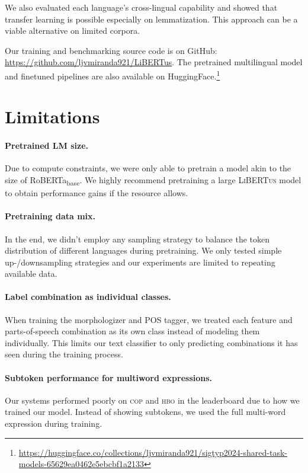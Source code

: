 \documentclass[11pt]{article}
\newcommand{\libertus}{\textsc{LiBERTus}}
\newcommand{\githuburl}{\url{https://github.com/ljvmiranda921/LiBERTus}}
\begin{document}
We also evaluated each language's cross-lingual capability and showed that transfer learning is possible especially on lemmatization.
This approach can be a viable alternative on limited corpora.

Our training and benchmarking source code is on GitHub: \githuburl{}.
The pretrained multilingual model and finetuned pipelines are also available on HuggingFace.\footnote[2]{\url{https://huggingface.co/collections/ljvmiranda921/sigtyp2024-shared-task-models-65629ea0462e5ebcbf1a2133}}

\section*{Limitations}

\paragraph{Pretrained LM size.}
Due to compute constraints, we were only able to pretrain a model akin to the size of RoBERTa\textsubscript{base}.
We highly recommend pretraining a large \libertus{} model to obtain performance gains if the resource allows.

\paragraph{Pretraining data mix.}
In the end, we didn't employ any sampling strategy to balance the token distribution of different languages during pretraining.
We only tested simple up-/downsampling strategies and our experiments are limited to repeating available data.

\paragraph{Label combination as individual classes.}
When training the morphologizer and POS tagger, we treated each feature and parts-of-speech combination as its own class instead of modeling them individually.
This limits our text classifier to only predicting combinations it has seen during the training process.

\paragraph{Subtoken performance for multiword expressions.}
Our systems performed poorly on \textsc{cop} and \textsc{hbo} in the leaderboard due to how we trained our model.
Instead of showing subtokens, we used the full multi-word expression during training.
\end{document}
